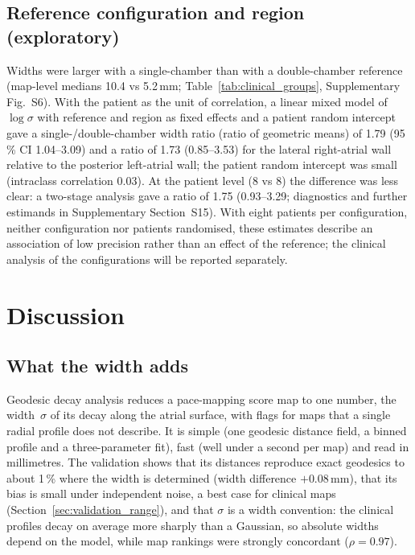 \documentclass[a4paper,fleqn]{cas-dc}
\begin{document}
\subsection{Reference configuration and region (exploratory)}\label{sec:clinical_reference}
Widths were larger with a single-chamber than with a double-chamber
reference (map-level medians 10.4 vs 5.2\,mm;
Table~\ref{tab:clinical_groups}, Supplementary Fig.~S6).  With
the patient as the unit of correlation, a linear mixed model of
$\log\sigma$ with reference and region as fixed effects and a patient
random intercept gave a single-/double-chamber width ratio (ratio of
geometric means) of 1.79 (95\,\% CI 1.04--3.09) and a ratio of 1.73
(0.85--3.53) for the lateral right-atrial wall relative to the posterior
left-atrial wall; the patient random intercept was small (intraclass
correlation 0.03).  At the patient level (8 vs 8) the difference was less
clear: a two-stage analysis gave a ratio of 1.75 (0.93--3.29;
diagnostics and further estimands in Supplementary Section~S15).  With
eight patients per configuration, neither configuration nor patients
randomised, these estimates describe an association of low precision
rather than an effect of the reference; the clinical analysis of the
configurations will be reported separately.


\section{Discussion}\label{sec:discussion}

\subsection{What the width adds}\label{sec:disc_method}
Geodesic decay analysis reduces a pace-mapping score map to one number,
the width~$\sigma$ of its decay along the atrial surface, with flags for
maps that a single radial profile does not describe.  It is simple (one
geodesic distance field, a binned profile and a three-parameter fit),
fast (well under a second per map) and read in millimetres.  The
validation shows that its distances reproduce exact geodesics to about
1\,\% where the width is determined (width difference $+0.08$\,mm), that
its bias is small under independent noise, a best case for clinical
maps (Section~\ref{sec:validation_range}), and that $\sigma$ is a width
convention: the clinical profiles decay on average more sharply than a
Gaussian, so absolute widths depend on the model, while map rankings
were strongly concordant ($\rho = 0.97$).
\end{document}
